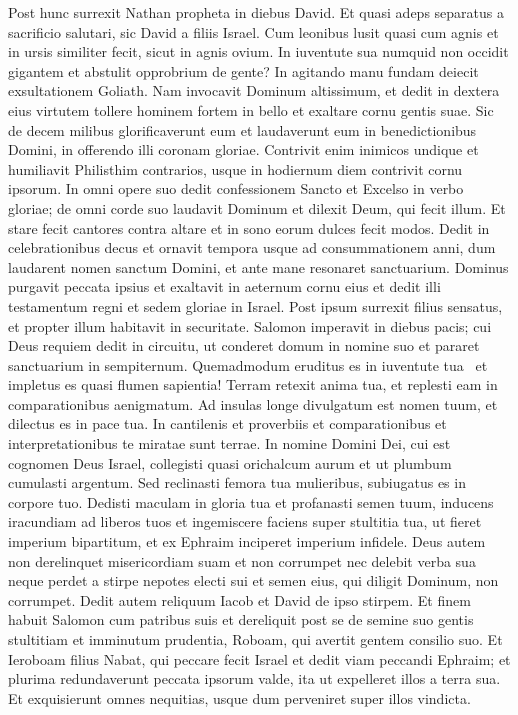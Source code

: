 \begin{biblechapter}  
\verse Post hunc surrexit Nathan propheta in diebus David. 
\verse Et quasi adeps separatus a sacrificio salutari, sic David a filiis Israel. 
\verse Cum leonibus lusit quasi cum agnis et in ursis similiter fecit, sicut in agnis ovium. 
\verse In iuventute sua numquid non occidit gigantem et abstulit opprobrium de gente? 
\verse In agitando manu fundam deiecit exsultationem Goliath. 
\verse Nam invocavit Dominum altissimum, et dedit in dextera eius virtutem tollere hominem fortem in bello et exaltare cornu gentis suae. 
\verse Sic de decem milibus glorificaverunt eum et laudaverunt eum in benedictionibus Domini, in offerendo illi coronam gloriae. 
\verse Contrivit enim inimicos undique et humiliavit Philisthim contrarios, usque in hodiernum diem contrivit cornu ipsorum. 
\verse In omni opere suo dedit confessionem Sancto et Excelso in verbo gloriae; 
\verse de omni corde suo laudavit Dominum et dilexit Deum, qui fecit illum. 
\verse Et stare fecit cantores contra altare et in sono eorum dulces fecit modos. 
\verse Dedit in celebrationibus decus et ornavit tempora usque ad consummationem anni, dum laudarent nomen sanctum Domini, et ante mane resonaret sanctuarium. 
\verse Dominus purgavit peccata ipsius et exaltavit in aeternum cornu eius et dedit illi testamentum regni et sedem gloriae in Israel. 
\verse Post ipsum surrexit filius sensatus, et propter illum habitavit in securitate. 
\verse Salomon imperavit in diebus pacis; cui Deus requiem dedit in circuitu, ut conderet domum in nomine suo et pararet sanctuarium in sempiternum. Quemadmodum eruditus es in iuventute tua  
\verse et impletus es quasi flumen sapientia! Terram retexit anima tua, 
\verse et replesti eam in comparationibus aenigmatum. Ad insulas longe divulgatum est nomen tuum, et dilectus es in pace tua. 
\verse In cantilenis et proverbiis et comparationibus et interpretationibus te miratae sunt terrae. 
\verse In nomine Domini Dei, cui est cognomen Deus Israel, 
\verse collegisti quasi orichalcum aurum et ut plumbum cumulasti argentum. 
\verse Sed reclinasti femora tua mulieribus, subiugatus es in corpore tuo. 
\verse Dedisti maculam in gloria tua et profanasti semen tuum, inducens iracundiam ad liberos tuos et ingemiscere faciens super stultitia tua, 
\verse ut fieret imperium bipartitum, et ex Ephraim inciperet imperium infidele. 
\verse Deus autem non derelinquet misericordiam suam et non corrumpet nec delebit verba sua neque perdet a stirpe nepotes electi sui et semen eius, qui diligit Dominum, non corrumpet. 
\verse Dedit autem reliquum Iacob et David de ipso stirpem. 
\verse Et finem habuit Salomon cum patribus suis 
\verse et dereliquit post se de semine suo gentis stultitiam 
\verse et imminutum prudentia, Roboam, qui avertit gentem consilio suo. 
\verse Et Ieroboam filius Nabat, qui peccare fecit Israel et dedit viam peccandi Ephraim; et plurima redundaverunt peccata ipsorum valde, 
\verse ita ut expelleret illos a terra sua. 
\verse Et exquisierunt omnes nequitias, usque dum perveniret super illos vindicta. 
\end{biblechapter}

